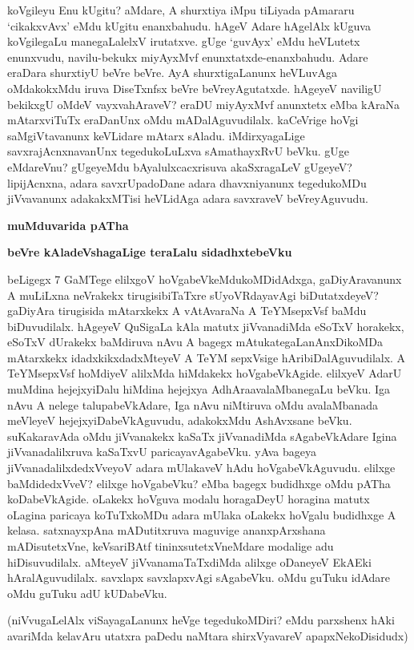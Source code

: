 \noindent
koVgileyu Enu kUgitu? aMdare, A shurxtiya iMpu tiLiyada pAmararu `cikakxvAvx' eMdu kUgitu enanxbahudu. hAgeV Adare hAgelAlx kUguva koVgilegaLu manegaLalelxV irutatxve. gUge `guvAyx' eMdu heVLutetx enunxvudu, navilu-bekukx miyAyxMvf enunxtatxde-enanxbahudu. Adare eraDara shurxti\-yU beVre beVre. AyA shurxtigaLanunx heVLuvAga oMdakokxMdu iruva DiseTxnfsx beVre beVreyAgutatxde. hAgeyeV naviligU bekikxgU oMdeV vayxvahAraveV? eraDU miyAyxMvf anunxtetx eMba kAraNa mAtarx\-viTuTx era\-DanUnx oMdu mADalAguvudilalx. kaCeVrige hoVgi saMgiVtavanunx keVLidare mAtarx sAladu. iMdirxya\-gaLige savxrajAcnxnavanUnx tegedukoLuLxva sAmathayxRvU beVku. gUge eMdareVnu? gUgeyeMdu bAya\-lulxcacx\-risuva akaSxragaLeV gUgeyeV? lipijAcnxna, adara savxrUpadoDane adara dhavxniyanunx tegedu\-koMDu jiVvavanunx adakakxMTisi heVLidAga adara savxraveV beVreyAguvudu. 

{\bigskip
\noindent
{\Large\bf muMduvarida pATha}}

{\bigskip
\noindent
{\large\bf beVre kAladeVshagaLige teraLalu sidadhxtebeVku}}\label{page126}
\medskip

\noindent
beLigegx 7 GaMTege elilxgoV hoVgabeVkeMdukoMDidAdxga, gaDiyAravanunx A muLiLxna neVrakekx tirugisi\-biTaTxre sUyoVRdayavAgi biDutatxdeyeV? gaDiyAra tirugisida mAtarxkekx A vAtAvaraNa A TeYM\-sepxVsf baMdu biDuvudilalx. hAgeyeV QuSigaLa kAla matutx jiVvanadiMda eSoTxV horakekx, eSoTxV dUrakekx baMdiruva nAvu A bagegx mAtukategaLanAnxDikoMDa mAtarxkekx idadxkikxdadxMteyeV A TeYM sepxVsige hAribiDalAguvudilalx. A TeYMsepxVsf hoMdiyeV alilxMda hiMdakekx hoVgabeVkAgide. elilxyeV AdarU muMdina hejejxyiDalu hiMdina hejejxya AdhAraavalaMbanegaLu beVku. Iga nAvu A nelege talupa\-beVkAdare, Iga nAvu niMtiruva oMdu avalaMbanada meVleyeV hejejxyiDabeVkAguvudu, ada\-kokxMdu AshAvxsane beVku. suKakaravAda oMdu jiVvanakekx kaSaTx jiVvanadiMda sAgabeVkAdare Igina jiVvana\-dalilx\-ruva kaSaTxvU paricayavAgabeVku. yAva bageya jiVvanadalilxdedxVveyoV adara mUlakaveV hAdu 
hoVga\-beVkA\-guvudu. elilxge baMdidedxVveV? elilxge hoVgabeVku? eMba bagegx budidhxge oMdu pATha koDa\-beVkA\-gide. oLakekx hoVguva modalu horagaDeyU horagina matutx oLagina paricaya koTuTx\-koMDu adara mUlaka oLakekx hoVgalu budidhxge A kelasa. satxnayxpAna mADutitxruva maguvige ananxpArxshana mADisu\-tetxVne, keVsariBAtf tininxsutetxVneMdare modalige adu hiDisuvudilalx. aMteyeV jiVvanamaTaTxdiMda alilxge oDaneyeV EkAEki hAralAguvudilalx. savxlapx savxlapxvAgi sAgabeVku. oMdu guTuku idAdare oMdu guTuku adU kUDabeVku.

(niVvugaLelAlx viSayagaLanunx heVge tegedukoMDiri? eMdu parxshenx hAki avariMda kelavAru utatxra paDedu naMtara shirxVyavareV apapxNekoDisidudx)

